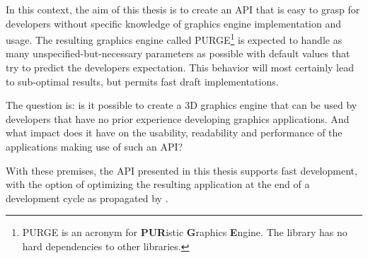 In this context, the aim of this thesis is to create an API that is easy to grasp for developers without specific knowledge of graphics engine implementation and usage. The resulting graphics engine called PURGE\footnote{PURGE is an acronym for \textbf{PUR}istic \textbf{G}raphics \textbf{E}ngine. The library has no hard dependencies to other libraries.} is expected to handle as many unspecified-but-necessary parameters as possible with default values that try to predict the developers expectation. This behavior will most certainly lead to sub-optimal results, but permits fast draft implementations.


The question is: is it possible to create a 3D graphics engine that can be used by developers that have no prior experience developing graphics applications. And what impact does it have on the usability, readability and performance of the applications making use of such an API?
 

With these premises, the API presented in this thesis supports fast development, with the option of optimizing the resulting application at the end of a development cycle as propagated by \cite{Knuth:1974:SPG:356635.356640}.

